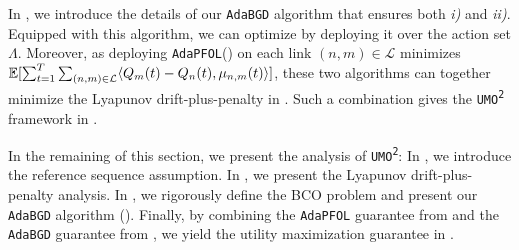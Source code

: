 \documentclass[11pt,fullpage,letterpaper]{article} %
\renewcommand{\bm}[1]{#1}%
\newcommand{\E}{\operatornamewithlimits{\mathbb{E}}}
\newcommand{\mL}{{\mathcal L}}
\newcommand{\UMAlg}{\texttt{UMO}\textsuperscript{\texttt{2}}\xspace}
\newcommand{\OLOAlg}{\texttt{AdaPFOL}\xspace}
\newcommand{\BCOAlg}{\texttt{AdaBGD}\xspace}
\begin{document}
In , we introduce the details of our \BCOAlg algorithm that ensures both \textit{i)} and \textit{ii)}.
Equipped with this algorithm, we can optimize  by deploying it over the action set $\Lambda$.
Moreover, as deploying \OLOAlg () on each link $(n,m)\in \mL$ minimizes $\E[\sum_{t=1}^T \sum_{(n,m)\in \mL} \langle \bm Q_m(t)-\bm Q_n(t),\bm \mu_{n,m}(t)\rangle]$, these two algorithms can together minimize the Lyapunov drift-plus-penalty in . Such a combination gives the \UMAlg framework in .

In the remaining of this section, we present the analysis of \UMAlg: In , we introduce the reference sequence assumption. In , we present the Lyapunov drift-plus-penalty analysis. In , we rigorously define the BCO problem and present our \BCOAlg algorithm (). Finally, by combining the \OLOAlg guarantee from  and the \BCOAlg guarantee from , we yield the utility maximization guarantee in .
\end{document}

